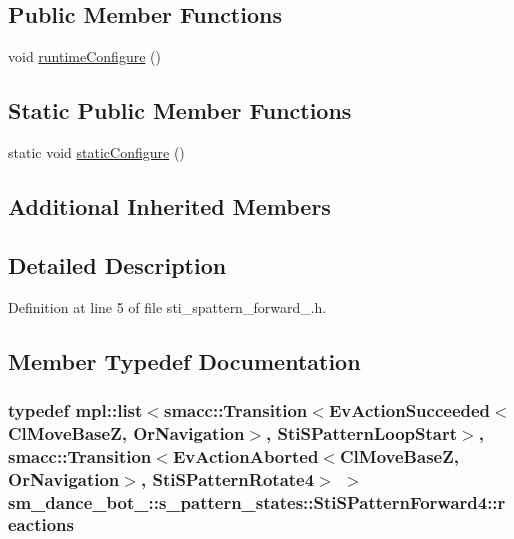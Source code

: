 \subsection*{Public Member Functions}
\begin{DoxyCompactItemize}
\item 
void \hyperlink{structsm__dance__bot__3_1_1s__pattern__states_1_1StiSPatternForward4_a15b3273c14e872d70efdc2ec1fa349bc}{runtime\+Configure} ()
\end{DoxyCompactItemize}
\subsection*{Static Public Member Functions}
\begin{DoxyCompactItemize}
\item 
static void \hyperlink{structsm__dance__bot__3_1_1s__pattern__states_1_1StiSPatternForward4_af30d4401cc2150b74edac6eae4f2a54f}{static\+Configure} ()
\end{DoxyCompactItemize}
\subsection*{Additional Inherited Members}


\subsection{Detailed Description}


Definition at line 5 of file sti\+\_\+spattern\+\_\+forward\+\_.\+h.



\subsection{Member Typedef Documentation}
\subsubsection[{\texorpdfstring{reactions}{reactions}}]{\setlength{\rightskip}{0pt plus 5cm}typedef mpl\+::list$<${\bf smacc\+::\+Transition}$<$Ev\+Action\+Succeeded$<${\bf Cl\+Move\+BaseZ}, {\bf Or\+Navigation}$>$, {\bf Sti\+S\+Pattern\+Loop\+Start}$>$, {\bf smacc\+::\+Transition}$<$Ev\+Action\+Aborted$<${\bf Cl\+Move\+BaseZ}, {\bf Or\+Navigation}$>$, {\bf Sti\+S\+Pattern\+Rotate4}$>$ $>$ {\bf sm\+\_\+dance\+\_\+bot\+\_\+::s\+\_\+pattern\+\_\+states\+::\+Sti\+S\+Pattern\+Forward4\+::reactions}}\hypertarget{structsm__dance__bot__3_1_1s__pattern__states_1_1StiSPatternForward4_ad3d02c92571c5761e0ace58317bdbb40}{}\label{structsm__dance__bot__3_1_1s__pattern__states_1_1StiSPatternForward4_ad3d02c92571c5761e0ace58317bdbb40}



